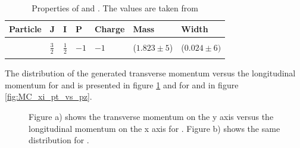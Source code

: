 \begin{table}[bp]
	\centering
	\caption{Properties of \excitedcascade and \excitedanticascade. The values are taken from \cite{PDG}}
	\label{tab:eventgeneration_Xivalues}
	\begin{tabular}{lllllll}
		\hline
		Particle & J & I & P & Charge & Mass  & Width \\
		\hline
		\hline
		&&&&&&\\
		\excitedcascade & $\frac{3}{2}$ & $\frac{1}{2}$ & $-1$ & $-1$ & ($1.823 \pm 5$) \massunit & ($0.024 \pm 6) $ \massunit \\
		&&&&&&\\
		\hline
		  
	\end{tabular}
\end{table}

The distribution of the generated transverse momentum versus the longitudinal momentum for \lam and \alam is presented in figure \ref{fig:MC_lambda0_pt_vs_pz} and for \anticascade and \excitedcascade in figure \ref{fig:MC_xi_pt_vs_pz}.\\


\begin{figure}
	\caption{\propose Figure a) shows the transverse momentum on the y axis versus the longitudinal momentum on the x axis for \lam. Figure b) 
			shows the same distribution for \alam.}
	\label{fig:MC_lambda0_pt_vs_pz}
\end{figure}


